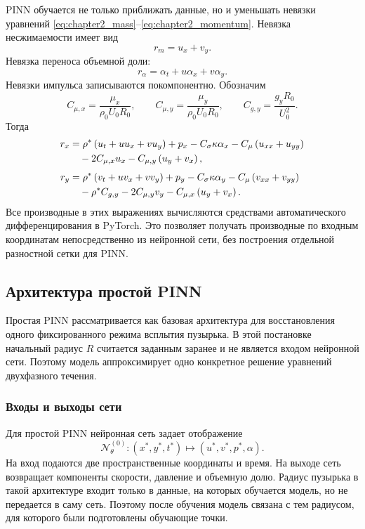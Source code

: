 \documentclass[12pt,a4paper]{article}
\newcommand{\Rbase}{R_0}
\newcommand{\Uref}{U_0}
\newcommand{\rhoref}{\rho_0}
\begin{document}
PINN обучается не только приближать данные, но и уменьшать невязки уравнений
\eqref{eq:chapter2_mass}--\eqref{eq:chapter2_momentum}. Невязка
несжимаемости имеет вид
\begin{equation}
    r_m=u_x+v_y.
\end{equation}
Невязка переноса объемной доли:
\begin{equation}
    r_\alpha=\alpha_t+u\alpha_x+v\alpha_y.
\end{equation}
Невязки импульса записываются покомпонентно. Обозначим
\[
    C_{\mu,x}=\frac{\mu_x}{\rhoref\Uref\Rbase},
    \qquad
    C_{\mu,y}=\frac{\mu_y}{\rhoref\Uref\Rbase},
    \qquad
    C_{g,y}=\frac{g_y\Rbase}{\Uref^2}.
\]
Тогда
\begin{align}
    r_x
    &=
    \rho^*
    \left(u_t+uu_x+vu_y\right)
    +p_x
    -C_\sigma\kappa\alpha_x
    -C_\mu\left(u_{xx}+u_{yy}\right)
    \notag\\
    &\quad
    -2C_{\mu,x}u_x
    -C_{\mu,y}\left(u_y+v_x\right),
    \label{eq:chapter2_rx}
    \\[0.4em]
    r_y
    &=
    \rho^*
    \left(v_t+uv_x+vv_y\right)
    +p_y
    -C_\sigma\kappa\alpha_y
    -C_\mu\left(v_{xx}+v_{yy}\right)
    \notag\\
    &\quad
    -\rho^*C_{g,y}
    -2C_{\mu,y}v_y
    -C_{\mu,x}\left(u_y+v_x\right).
    \label{eq:chapter2_ry}
\end{align}
Все производные в этих выражениях вычисляются средствами автоматического
дифференцирования в PyTorch. Это позволяет получать производные по входным
координатам непосредственно из нейронной сети, без построения отдельной
разностной сетки для PINN.

\subsection{Архитектура простой PINN}

Простая PINN рассматривается как базовая архитектура для восстановления одного
фиксированного режима всплытия пузырька. В этой постановке начальный радиус
\(R\) считается заданным заранее и не является входом нейронной сети. Поэтому
модель аппроксимирует одно конкретное решение уравнений двухфазного течения.

\subsubsection{Входы и выходы сети}

Для простой PINN нейронная сеть задает отображение
\[
    \mathcal{N}_{\theta}^{(0)}:
    (x^*,y^*,t^*)\mapsto (u^*,v^*,p^*,\alpha).
\]
На вход подаются две пространственные координаты и время. На выходе сеть
возвращает компоненты скорости, давление и объемную долю. Радиус пузырька в
такой архитектуре входит только в данные, на которых обучается модель, но не
передается в саму сеть. Поэтому после обучения модель связана с тем радиусом,
для которого были подготовлены обучающие точки.
\end{document}

